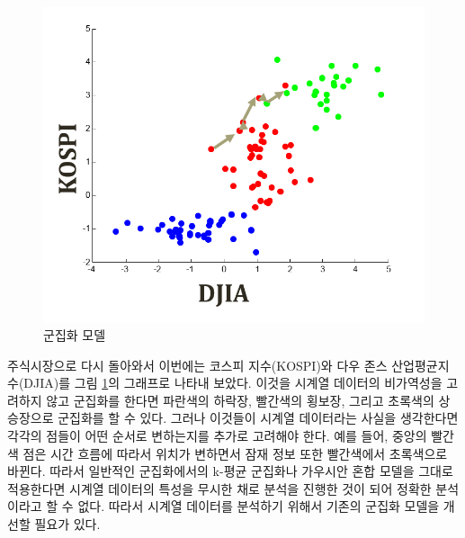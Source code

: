\documentclass[a4paper]{oblivoir}
\begin{document}
\begin{figure}[ht] \centering 
\includegraphics[scale=0.8]{fig9_3.png} 
\caption{군집화 모델}
\label{fig:9-3}
\end{figure}

주식시장으로 다시 돌아와서 이번에는 코스피 지수(KOSPI)와 다우 존스 산업평균지수(DJIA)를 그림 \ref{fig:9-3}의 그래프로 나타내 보았다. 이것을 시계열 데이터의 비가역성을 고려하지 않고 군집화를 한다면 파란색의 하락장, 빨간색의 횡보장, 그리고 초록색의 상승장으로 군집화를 할 수 있다. 그러나 이것들이 시계열 데이터라는 사실을 생각한다면 각각의 점들이 어떤 순서로 변하는지를 추가로 고려해야 한다. 예를 들어, 중앙의 빨간색 점은 시간 흐름에 따라서 위치가 변하면서 잠재 정보 또한 빨간색에서 초록색으로 바뀐다. 따라서 일반적인 군집화에서의 k-평균 군집화나 가우시안 혼합 모델을 그대로 적용한다면 시계열 데이터의 특성을 무시한 채로 분석을 진행한 것이 되어 정확한 분석이라고 할 수 없다. 따라서 시계열 데이터를 분석하기 위해서 기존의 군집화 모델을 개선할 필요가 있다. \\
\end{document}
